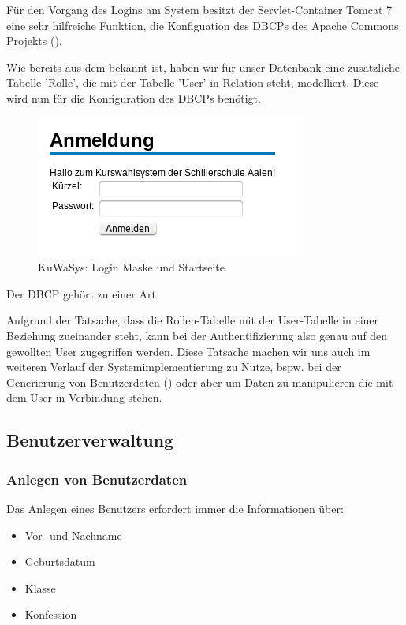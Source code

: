 Für den Vorgang des Logins am System besitzt der Servlet-Container Tomcat 7 eine sehr hilfreiche Funktion, die Konfiguation des \ac{DBCP}s des Apache Commons Projekts (\cite{tomcatDBCP}). 

Wie bereits aus dem  bekannt ist, haben wir für unser Datenbank eine zusätzliche Tabelle 'Rolle', die mit der Tabelle 'User' in Relation steht, modelliert. Diese wird nun für die Konfiguration des \ac{DBCP}s benötigt.

\begin{figure}
 \begin{center}
   \includegraphics[scale=0.7]{img/login_KuWaSys.png}
 \end{center}
 \caption[\textbf{KuWaSys: Login Maske und Startseite}]{KuWaSys: Login Maske und Startseite}
 \label{fig:login_KuWaSys}
\end{figure}

Der \ac{DBCP} gehört zu einer Art

Aufgrund der Tatsache, dass die Rollen-Tabelle mit der User-Tabelle in einer Beziehung zueinander steht, kann bei der Authentifizierung also genau auf den gewollten User zugegriffen werden. Diese Tatsache machen wir uns auch im weiteren Verlauf der Systemimplementierung zu Nutze, bspw. bei der Generierung von Benutzerdaten () oder aber um Daten zu manipulieren die mit dem User in Verbindung stehen.

\subsection{Benutzerverwaltung}\label{subsec:Daten eines Benutzers}

\subsubsection{Anlegen von Benutzerdaten}

Das Anlegen eines Benutzers erfordert immer die Informationen über:
\begin{itemize}
  \item Vor- und Nachname
  \item Geburtsdatum
  \item Klasse
  \item Konfession
\end{itemize}

